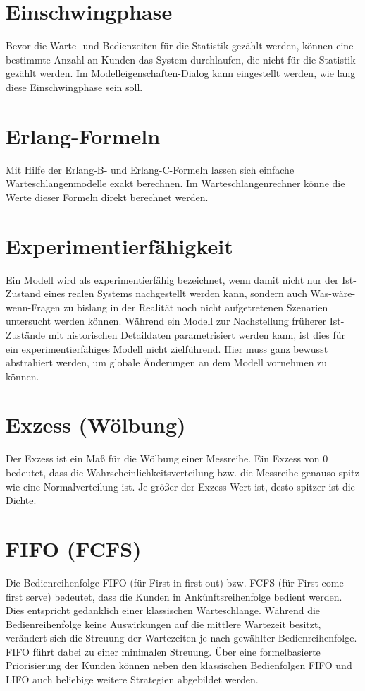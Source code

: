 \section*{Einschwingphase}


Bevor die Warte- und Bedienzeiten für die Statistik gezählt werden, können eine bestimmte Anzahl an Kunden
das System durchlaufen, die nicht für die Statistik gezählt werden. Im
Modelleigenschaften-Dialog kann eingestellt werden, wie lang diese
Einschwingphase sein soll.

\section*{Erlang-Formeln}


Mit Hilfe der Erlang-B- und Erlang-C-Formeln lassen sich einfache Warteschlangenmodelle exakt berechnen.
Im Warteschlangenrechner könne die Werte dieser Formeln direkt
berechnet werden.

\section*{Experimentierfähigkeit}


Ein Modell wird als experimentierfähig bezeichnet, wenn damit nicht nur der Ist-Zustand eines
realen Systems nachgestellt werden kann, sondern auch Was-wäre-wenn-Fragen zu bislang in der Realität
noch nicht aufgetretenen Szenarien untersucht  werden können. Während ein Modell zur Nachstellung
früherer Ist-Zustände mit historischen Detaildaten parametrisiert werden kann, ist
dies für ein experimentierfähiges Modell nicht zielführend. Hier muss ganz bewusst abstrahiert
werden, um globale Änderungen an dem Modell vornehmen zu können.

\section*{Exzess (Wölbung)}


Der Exzess ist ein Maß für die Wölbung einer Messreihe.
Ein Exzess von 0 bedeutet, dass die Wahrscheinlichkeitsverteilung bzw. die Messreihe genauso spitz wie eine Normalverteilung ist.
Je größer der Exzess-Wert ist, desto spitzer ist die Dichte.

\section*{FIFO (FCFS)}


Die Bedienreihenfolge FIFO (für First in first out) bzw. FCFS (für First come first serve) bedeutet,
dass die Kunden in Ankünftsreihenfolge bedient werden. Dies entspricht gedanklich einer klassischen Warteschlange.
Während die Bedienreihenfolge keine Auswirkungen auf die mittlere Wartezeit besitzt, verändert sich
die Streuung der Wartezeiten je nach gewählter Bedienreihenfolge. FIFO führt dabei zu einer minimalen Streuung.
Über eine formelbasierte Priorisierung der Kunden können neben den klassischen Bedienfolgen FIFO und LIFO auch
beliebige weitere Strategien abgebildet werden.

